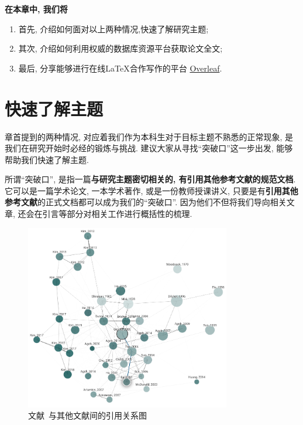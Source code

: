 \documentclass{formatBook}
\begin{document}
\textbf{在本章中, 我们将}
\begin{enumerate}
    \item 首先, 介绍如何面对以上两种情况,快速了解研究主题;
    \item 其次, 介绍如何利用权威的数据库资源平台获取论文全文;
    \item 最后, 分享能够进行在线\LaTeX 合作写作的平台 \href{https://www.overleaf.com/}{Overleaf}.
\end{enumerate}

\section{快速了解主题}
章首提到的两种情况, 对应着我们作为本科生对于目标主题不熟悉的正常现象, 是我们在研究开始时必经的锻炼与挑战. 建议大家从寻找``突破口''这一步出发, 能够帮助我们快速了解主题.

所谓``突破口'', 是指一篇\textbf{与研究主题密切相关的, 有引用其他参考文献的规范文档}. 它可以是一篇学术论文, 一本学术著作, 或是一份教师授课讲义, 只要是有\textbf{引用其他参考文献}的正式文档都可以成为我们的``突破口''. 因为他们不但将我们导向相关文章, 还会在引言等部分对相关工作进行概括性的梳理.

\begin{figure}[H]
    \centering
    \includegraphics[width=0.8\textwidth]{figure/graph.png}
    \caption{文献~\cite{gessel_mikis_2005}与其他文献间的引用关系图}
    \label{fig:mikiGrapg}
\end{figure}
\end{document}

